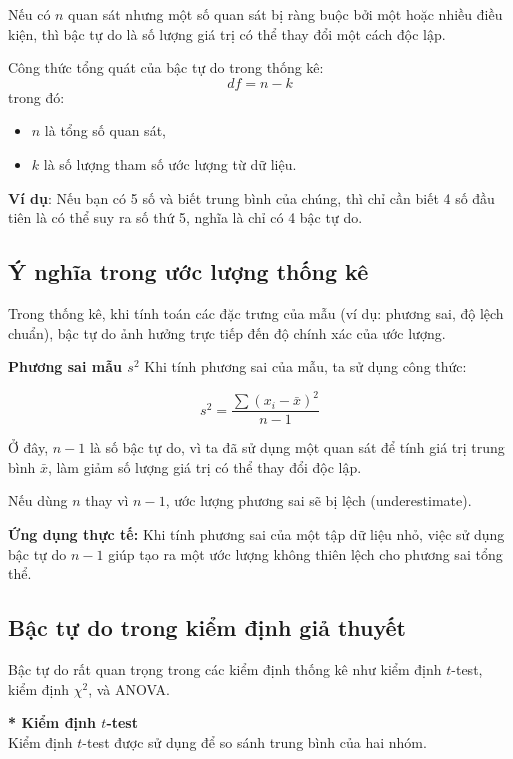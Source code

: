 Nếu có $n$ quan sát nhưng một số quan sát bị ràng buộc bởi một hoặc nhiều điều kiện, thì bậc tự do là số lượng giá trị có thể thay đổi một cách độc lập.

Công thức tổng quát của bậc tự do trong thống kê:
\begin{equation}
    df = n - k
\end{equation}
trong đó:
\begin{itemize}
    \item $n$ là tổng số quan sát,
    \item $k$ là số lượng tham số ước lượng từ dữ liệu.
\end{itemize}

\textbf{Ví dụ}: Nếu bạn có 5 số và biết trung bình của chúng, thì chỉ cần biết 4 số đầu tiên là có thể suy ra số thứ 5, nghĩa là chỉ có 4 bậc tự do.

\subsection{Ý nghĩa trong ước lượng thống kê}

Trong thống kê, khi tính toán các đặc trưng của mẫu (ví dụ: phương sai, độ lệch chuẩn), bậc tự do ảnh hưởng trực tiếp đến độ chính xác của ước lượng.

\textbf{Phương sai mẫu $s^2$}
Khi tính phương sai của mẫu, ta sử dụng công thức:

\begin{equation}
    s^2 = \frac{\sum (x_i - \bar{x})^2}{n - 1}
\end{equation}

Ở đây, $n - 1$ là số bậc tự do, vì ta đã sử dụng một quan sát để tính giá trị trung bình $\bar{x}$, làm giảm số lượng giá trị có thể thay đổi độc lập.

Nếu dùng $n$ thay vì $n - 1$, ước lượng phương sai sẽ bị lệch (underestimate).

\textbf{Ứng dụng thực tế: }
Khi tính phương sai của một tập dữ liệu nhỏ, việc sử dụng bậc tự do $n - 1$ giúp tạo ra một ước lượng không thiên lệch cho phương sai tổng thể.


\subsection{Bậc tự do trong kiểm định giả thuyết}
Bậc tự do rất quan trọng trong các kiểm định thống kê như kiểm định $t$-test, kiểm định $\chi^2$, và ANOVA.

\noindent\textbf{* Kiểm định $t$-test}\\
Kiểm định $t$-test được sử dụng để so sánh trung bình của hai nhóm.

